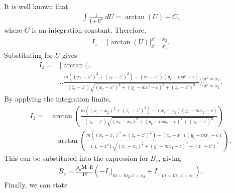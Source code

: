 It is well known that
\begin{align}
    \int \frac{1}{1+U^2}\ dU = \arctan \left(U\right) + C \text{,}
\end{align}
where \(C\) is an integration constant. Therefore,
\begin{align}
    I_z = \bigg[ \arctan \left(U\right) \bigg]_{x'=x_1}^{x'=x_2} \text{.}
\end{align}
Substituting for \(U\) gives
\begin{align}
    I_z = &\Bigg[ \arctan \Bigg( \Bigg. \Bigg. \nonumber \\
    & \Bigg. \Bigg. \frac{m\left(\left(x_r-x'\right)^2+\left(z_r-z'\right)^2\right)-\left(x_r-x'\right)\left(y_r-mx'-c\right)}{\left(z_r-z'\right)\sqrt{\left(x_r-x'\right)^2+\left(y_r-mx'-c\right)^2+\left(z_r-z'\right)^2}} \Bigg) \Bigg]_{x'=x_1}^{x'=x_2} \text{.}
\end{align}
By applying the integration limits,
\begin{align}
    I_z =& \arctan \left( \frac{m\left(\left(x_r-x_2\right)^2+\left(z_r-z'\right)^2\right)-\left(x_r-x_2\right)\left(y_r-mx_2-c\right)}{\left(z_r-z'\right)\sqrt{\left(x_r-x_2\right)^2+\left(y_r-mx_2-c\right)^2+\left(z_r-z'\right)^2}} \right) \nonumber \\
    & - \arctan \left( \frac{m\left(\left(x_r-x_1\right)^2+\left(z_r-z'\right)^2\right)-\left(x_r-x_1\right)\left(y_r-mx_1-c\right)}{\left(z_r-z'\right)\sqrt{\left(x_r-x_1\right)^2+\left(y_r-mx_1-c\right)^2+\left(z_r-z'\right)^2}} \right) \text{.}
\end{align}
This can be substituted into the expression for \(B_z\), giving
\begin{align}
    B_z = \frac{\mu_0\mathbf{M}\cdot\hat{\mathbf{n}}}{4\pi} \left( -\left. I_z \right|_{m=m_2,c=c_2} + \left. I_z \right|_{m=m_1,c=c_1} \right) \text{.}
\end{align}
Finally, we can state
